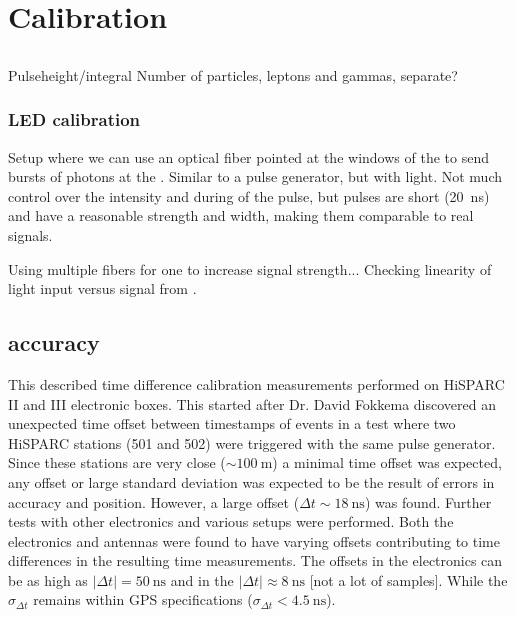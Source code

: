 \chapter{Calibration}
\label{ch:calibration}

\section{\pmt}
\label{sec:pmt}

Pulseheight/integral
Number of particles, leptons and gammas, separate?


\subsection{LED calibration}
\label{sub:led_calibration}

Setup where we can use an optical fiber pointed at the windows of the
\pmt to send bursts of photons at the \pmt. Similar to a pulse
generator, but with light. Not much control over the intensity and
during of the pulse, but pulses are short (\SI{20}{\nano\second}) and
have a reasonable strength and width, making them comparable to real
signals.

Using multiple fibers for one \pmt to increase signal strength...
Checking linearity of light input versus signal from \pmt.


\section{\gps accuracy}
\label{sec:gps_accuracy}

This described time difference calibration measurements performed on
HiSPARC II and III electronic boxes. This started after Dr. David
Fokkema discovered an unexpected time offset between timestamps of
events in a test where two HiSPARC stations (501 and 502) were triggered
with the same pulse generator. Since these stations are very close
($\sim\SI{100}{\meter}$) a minimal time offset was expected, any offset
or large standard deviation was expected to be the result of errors in
\gps accuracy and position. However, a large offset ($\Delta t
\sim\SI{18}{\nano\second}$) was found. Further tests with other \hisparc
electronics and various setups were performed. Both the \hisparc
electronics and \gps antennas were found to have varying offsets
contributing to time differences in the resulting time measurements. The
offsets in the \hisparc electronics can be as high as $|\Delta t| =
\SI{50}{\nano\second}$ and in the \gps $|\Delta t| \approx
\SI{8}{\nano\second}$ [not a lot of samples]. While the $\sigma_{\Delta
t}$ remains within GPS specifications ($\sigma_{\Delta t} <
\SI{4.5}{\nano\second}$).


